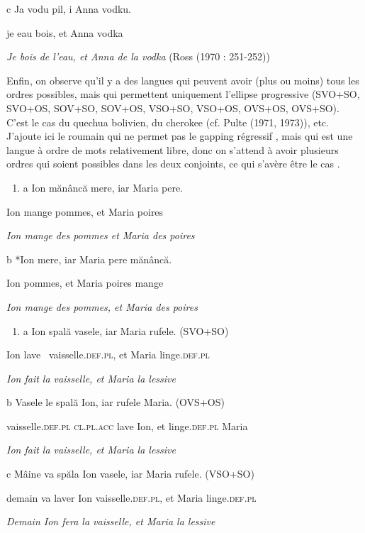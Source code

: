  c  Ja vodu pil, i Anna vodku.

je eau bois, et Anna vodka 

\textit{Je bois de l'eau, et Anna de la vodka       } (Ross (1970 : 251-252))

Enfin, on observe qu'il y a des langues qui peuvent avoir (plus ou moins) tous les ordres possibles, mais qui permettent uniquement l'ellipse progressive (SVO+SO, SVO+OS, SOV+SO, SOV+OS, VSO+SO, VSO+OS, OVS+OS, OVS+SO). C'est le cas du quechua bolivien, du cherokee (cf. Pulte (1971, 1973)), etc. J'ajoute ici le roumain qui ne permet pas le gapping régressif , mais qui est une langue à ordre de mots relativement libre, donc on s'attend à avoir plusieurs ordres qui soient possibles dans les deux conjoints, ce qui s'avère être le cas .


\begin{enumerate}
\item \label{bkm:Ref287466258}a  Ion mănâncă mere, iar Maria pere.


\end{enumerate}
Ion mange pommes, et Maria poires

{\itshape
Ion mange des pommes et Maria des poires}

 b  *Ion mere, iar Maria pere mănâncă.

Ion pommes, et Maria poires mange

{\itshape
Ion mange des pommes, et Maria des poires}


\begin{enumerate}
\item \label{bkm:Ref287466272}a  Ion spală vasele,     iar Maria rufele. (SVO+SO)


\end{enumerate}
Ion lave~ vaisselle.\textsc{def.pl}, et Maria linge.\textsc{def.pl}

{\itshape
Ion fait la vaisselle, et Maria la lessive}

 b  Vasele     le     spală Ion, iar rufele     Maria. (OVS+OS)

vaisselle.\textsc{def.pl cl.pl.acc} lave  Ion, et  linge.\textsc{def.pl} Maria

{\itshape
Ion fait la vaisselle, et Maria la lessive}

 c  Mâine  va  spăla Ion vasele,    iar Maria rufele. (VSO+SO)

demain va laver Ion  vaisselle.\textsc{def.pl,} et Maria linge.\textsc{def.pl}  

{\itshape
Demain Ion fera la vaisselle, et Maria la lessive}

